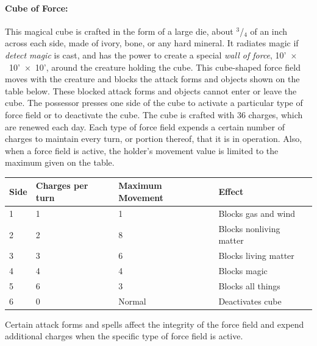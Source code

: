 \begin{multicols}{2}
\paragraph{Cube of Force:} This magical cube is crafted in the form of a large die, about $^3$/$_4$ of an inch across each side, made of ivory, bone, or any hard mineral.  It radiates magic if \textit{detect magic} is cast, and has the power to create a special \textit{wall of force}, 10'~$\times$~10'~$\times$~10', around the creature holding the cube.  This cube-shaped force field moves with the creature and blocks the attack forms and objects shown on the table below.  These blocked attack forms and objects cannot enter or leave the cube.  The possessor presses one side of the cube to activate a particular type of force field or to deactivate the cube.  The cube is crafted with 36 charges, which are renewed each day.  Each type of force field expends a certain number of charges to maintain every turn, or portion thereof, that it is in operation.  Also, when a force field is active, the holder's movement value is limited to the maximum given on the table.

\noindent \begin{tabular}{|p{}|p{}|p{}|p{}|}
\hline
Side	& Charges per turn	& Maximum Movement	& Effect \\
\hline\hline
\rowcolor[gray]{.9}1	& 1	& 1	& Blocks gas and wind \\
2	& 2	& 8	& Blocks nonliving matter \\
\rowcolor[gray]{.9}3	& 3	& 6	& Blocks living matter \\
4	& 4	& 4	& Blocks magic \\
\rowcolor[gray]{.9}5	& 6	& 3	& Blocks all things \\
6	& 0	& Normal	& Deactivates cube \\
\hline
\end{tabular}

Certain attack forms and spells affect the integrity of the force field and expend additional charges when the specific type of force field is active. 


\end{multicols}
